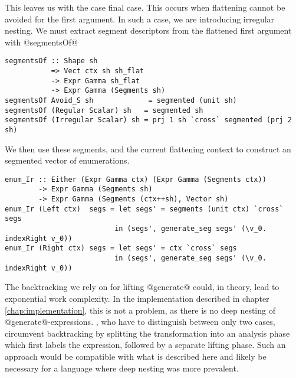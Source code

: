 This leaves us with the case final case. This occurs when flattening cannot be avoided for the first argument. In such a case, we are introducing irregular nesting. We must extract segment descriptors from the flattened first argument with @segmentsOf@
%
\begin{lstlisting}[style=ndp]
segmentsOf :: Shape sh
           => Vect ctx sh sh_flat
           -> Expr Gamma sh_flat
           -> Expr Gamma (Segments sh)
segmentsOf Avoid_S sh             = segmented (unit sh)
segmentsOf (Regular Scalar) sh   = segmented sh
segmentsOf (Irregular Scalar) sh = prj 1 sh `cross` segmented (prj 2 sh)
\end{lstlisting}
%
We then use these segments, and the current flattening context to construct an segmented vector of enumerations.
\begin{lstlisting}[style=ndp]
enum_Ir :: Either (Expr Gamma ctx) (Expr Gamma (Segments ctx))
        -> Expr Gamma (Segments sh)
        -> Expr Gamma (Segments (ctx++sh), Vector sh)
enum_Ir (Left ctx)  segs = let segs' = segments (unit ctx) `cross` segs
                          in (segs', generate_seg segs' (\v_0. indexRight v_0))
enum_Ir (Right ctx) segs = let segs' = ctx `cross` segs
                          in (segs', generate_seg segs' (\v_0. indexRight v_0))
\end{lstlisting}

The backtracking we rely on for lifting @generate@ could, in theory, lead to exponential work complexity. In the implementation described in chapter \ref{chap:implementation}, this is not a problem, as there is no deep nesting of @generate@-expressions. \citet{Keller:avoidance}, who have to distinguish between only two cases, circumvent backtracking by splitting the transformation into an analysis phase which first labels the expression, followed by a separate lifting phase. Such an approach would be compatible with what is described here and likely be necessary for a language where deep nesting was more prevalent.


